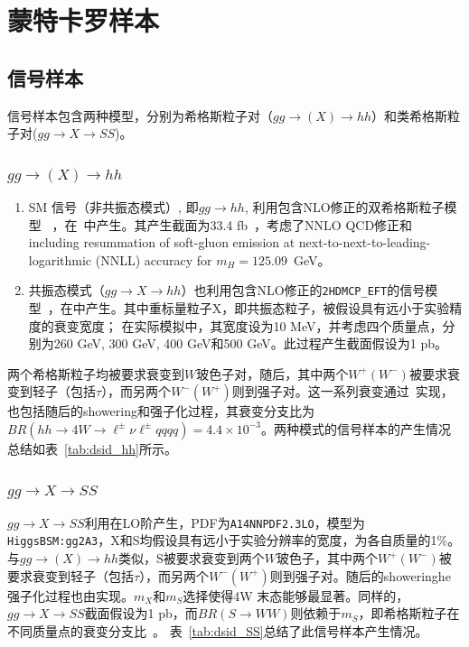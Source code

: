 \section{蒙特卡罗样本}

\subsection{信号样本}
信号样本包含两种模型，分别为希格斯粒子对（$gg\rightarrow (X) \rightarrow hh$）和类希格斯粒子对($gg \rightarrow X \rightarrow SS$)。
\subsubsection{$gg\rightarrow (X) \rightarrow hh$}
\begin{enumerate}
    \item SM 信号（非共振态模式）, 即$gg\rightarrow hh$, 利用包含NLO修正的双希格斯粒子模型~\cite{Frederix:2014hta}
，在\MGMCatNLO~\cite{madgraph5amcnlo,syscalc}中产生。其产生截面为33.4 fb~\cite{eftreweight,HiggsXSec}，考虑了NNLO QCD修正和including
resummation of soft-gluon emission at next-to-next-to-leading-logarithmic (NNLL) accuracy for $m_{H} = 125.09$~GeV。 
    \item 共振态模式（$gg\rightarrow X\rightarrow  hh$）也利用包含NLO修正的\texttt{2HDMCP\_EFT}的信号模型~\cite{MG5-HH-LO}，在\MGMCatNLO 中产生。其中重标量粒子X，即共振态粒子，被假设具有远小于实验精度的衰变宽度；
在实际模拟中，其宽度设为10 MeV，并考虑四个质量点，分别为260 GeV, 300 GeV, 400 GeV和500 GeV。此过程产生截面假设为1 pb。 
\end{enumerate}
两个希格斯粒子均被要求衰变到$W$玻色子对，随后，其中两个$W^{+}(W^{-})$被要求衰变到轻子（包括$\tau$），而另两个$W^{-}(W^{+})$则到强子对。这一系列衰变通过\Herwigpp~\cite{herwigpp}实现，也包括随后的showering和强子化过程，其衰变分支比为$BR(hh\rightarrow 4W \rightarrow \ell^{\pm}\nu\ell^{\pm}qqqq)=4.4\times10^{-3}$。两种模式的信号样本的产生情况总结如表~\ref{tab:dsid_hh}所示。


\subsubsection{$gg \rightarrow X \rightarrow SS$}
$gg \rightarrow X \rightarrow SS$利用在LO阶产生，PDF为\texttt{A14NNPDF2.3LO}，模型为\texttt{HiggsBSM:gg2A3}，X和S均假设具有远小于实验分辨率的宽度，为各自质量的1\%。与$gg\rightarrow (X) \rightarrow hh$类似，S被要求衰变到两个$W$玻色子，其中两个$W^{+}(W^{-})$被要求衰变到轻子（包括$\tau$），而另两个$W^{-}(W^{+})$则到强子对。随后的showeringhe强子化过程也由实现。$m_X$和$m_S$选择使得4W 末态能够最显著。同样的，$gg \rightarrow X \rightarrow SS$截面假设为1 pb，而$BR(S\rightarrow WW)$则依赖于$m_S$，即希格斯粒子在不同质量点的衰变分支比~\cite{Denner:2011mq}。
表~\ref{tab:dsid_SS}总结了此信号样本产生情况。


